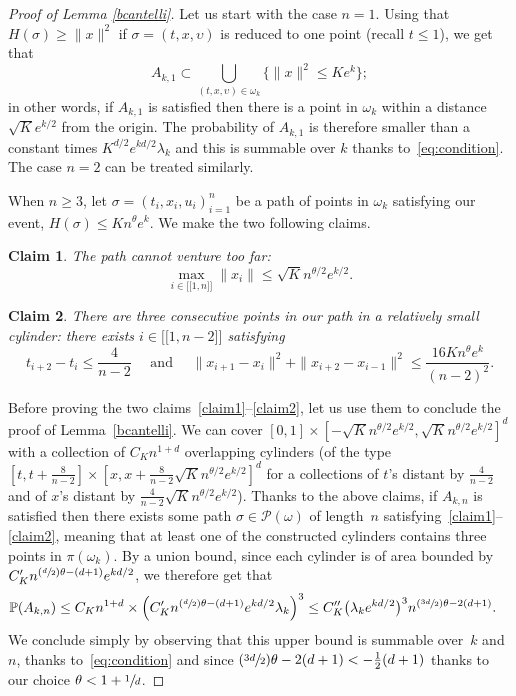 \documentclass[JEP,XML,SOM,Unicode,published]{cedram}
\let\mathcal\mathscr
\newcommand{\Psfrac}[2]{(\sfrac{#1}{#2})}
\newcommand{\lint}{\mathopen{[\![}}
\newcommand{\rint}{\mathclose{]\!]}}
\newtheorem{claim}{Claim}
\theoremstyle{definition}
\newcommand{\cP}{{\ensuremath{\mathcal P}} }
\newcommand{\bbP}{{\ensuremath{\mathbb P}} }
\let\gl\lambda
\let\ups\upsilon
\let\go\omega
\begin{document}
\begin{proof}[Proof of Lemma \ref{bcantelli}]
Let us start with the case $n=1$.
Using that $H(\sigma) \geq \|x\|^2$ if $\sigma =(t,x,\ups)$ is reduced to one point (recall $t\leq 1$), we get that
\[
A_{k,1} \subset \bigcup_{(t,x,\ups) \in \go_k} \{ \|x\|^2 \leq Ke^{k} \};
\]
in other words, if $A_{k,1}$ is satisfied then there
is a point in $\go_k$ within a distance $\sqrt{K} e^{k/2}$ from the origin.
The probability
of $A_{k,1}$ is therefore smaller than a constant times $ K^{d/2} e^{ kd /2} \gl_k$ and this is summable over $k$ thanks to~\eqref{eq:condition}. The case $n=2$ can be treated similarly.

When $n\ge 3$, let $\sigma = (t_i,x_i,u_i)_{i=1}^n$ be a path of points in
$\go_k$ satisfying our event, \ie $H(\sigma) \leq K n^{\theta} e^{k}$.
We make the two following claims.

\setcounter{claim}{0}
\begin{claim}
The path cannot venture too far:
\begin{equation}\label{claim1}
\max_{i\in \lint 1, n\rint} \|x_i\| \le \sqrt{K} n^{\theta/2} e^{k/2}.
\end{equation}
\end{claim}

\begin{claim}
There are three consecutive points in our path in a relatively small cylinder:
there exists $i \in \lint 1,n-2\rint$ satisfying
\begin{equation}\label{claim2}
t_{i+2}-t_i\le \frac{4}{n-2} \quad \text{ and } \quad
\|x_{i+1}-x_i \|^2+\|x_{i+2}-x_{i-1} \|^2
\le
\frac{16 K n^{\theta}e^{k}}{(n-2)^2}.
\end{equation}
\end{claim}

Before proving the two claims~\eqref{claim1}--\eqref{claim2},
let us use them to conclude the proof of Lemma~\ref{bcantelli}.
We can cover
$[0,1] \times [ - \sqrt{K} n^{\theta/2} e^{k/2}, \sqrt{K} n^{\theta/2} e^{k/2} ]^d$
with a collection of
$C_{K} n^{1+d}$ overlapping cylinders
(of the type $[t,t+\frac{8}{n-2}] \times [x,x+ \frac{8 }{n-2}\sqrt{K} n^{\theta/2} e^{k/2} ]^{d}$ for a collections of $t$'s distant by $\frac{4}{n-2}$ and of $x$'s distant by $\frac{4 }{n-2}\sqrt{K} n^{\theta/2} e^{k/2}$).
Thanks to the above claims,
if $A_{k,n}$ is satisfied
then there exists some path $\sigma \in \cP(\go)$
of length~$n$
satisfying~\eqref{claim1}--\eqref{claim2}, meaning that
at least one of the constructed cylinders contains
three points in $\pi(\go_k)$.
By a union bound, since
each cylinder is of area bounded by $C'_{K} n^{\Psfrac{d}{2} \theta -(d+1)} e^{kd/2}$, we therefore get that
\begin{align*}
\bbP(A_{k,n}) &\leq C_{K} n^{1+d} \times \Bigl(C'_{K} n^{\Psfrac{d}{2} \theta - (d+1) } e^{kd/2} \lambda_k\Bigr)^3
\leq C''_{K} \bigl(\gl_k e^{kd/2} \bigr)^3 n^{\Psfrac{3d}{2}\theta-2(d+1)}.
\end{align*}
We conclude simply by observing that this upper bound is summable over~$k$ and~$n$, thanks to~\eqref{eq:condition}
and since $\Psfrac{3d}{2}\theta-2(d+1) < -\frac12 (d+1)$ thanks to our choice $\theta<1+\sfrac{1}{d}$.


\end{proof}
\end{document}
